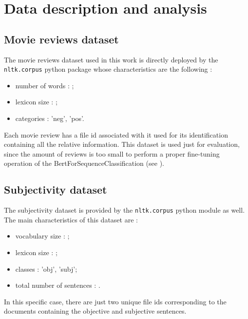 
\vspace{-0.25cm}
\section{Data description and analysis}
\label{sec:data} 
\subsection{Movie reviews dataset}
\label{subsec:mr}
The movie reviews dataset used in this work is directly deployed by the \texttt{nltk.corpus} python package whose characteristics are the following :
\begin{itemize}
    \item number of words : ;
    \item lexicon size : ;
    \item categories : 'neg', 'pos'.
\end{itemize}
Each movie review has a file id associated with it used for its identification containing all the relative information.
This dataset is used just for evaluation, since the amount of reviews is too small to perform a proper fine-tuning operation of the BertForSequenceClassification (see 
\textbf{}).

\subsection{Subjectivity dataset}
\label{subsec:subj}
The subjectivity dataset is provided by the \texttt{nltk.corpus} python module as well.\\ 
The main characteristics of this dataset are :
\begin{itemize}
    \item vocabulary size : ;
    \item lexicon size : ;
    \item classes : 'obj', 'subj';
    \item total number of sentences : .
\end{itemize}
In this specific case, there are just two unique file ids corresponding to the documents containing the objective and subjective sentences. 

